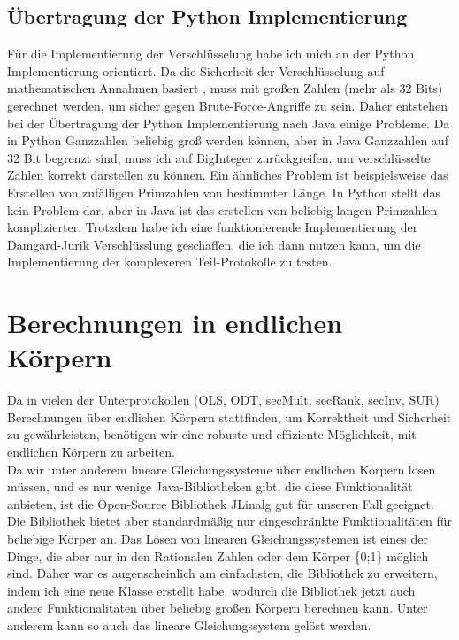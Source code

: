 \subsection{Übertragung der Python Implementierung}
Für die Implementierung der Verschlüsselung habe ich mich an der Python Implementierung \cite{swansonk14} orientiert. Da die Sicherheit der Verschlüsselung auf mathematischen Annahmen basiert  \cite{10.1007/3-540-48910-X_16}, muss mit großen Zahlen (mehr als 32 Bits) gerechnet werden, um sicher gegen Brute-Force-Angriffe zu sein. Daher entstehen bei der Übertragung der Python Implementierung nach Java einige Probleme. Da in Python Ganzzahlen beliebig groß werden können, aber in Java Ganzzahlen auf 32 Bit begrenzt sind, muss ich auf BigInteger zurückgreifen, um verschlüsselte Zahlen korrekt darstellen zu können.
Ein ähnliches Problem ist beispielsweise das Erstellen von zufälligen Primzahlen von bestimmter Länge. In Python stellt das kein Problem dar, aber in Java ist das erstellen von beliebig langen Primzahlen komplizierter. Trotzdem habe ich eine funktionierende Implementierung der Damgard-Jurik Verschlüsslung geschaffen, die ich dann nutzen kann, um die Implementierung der komplexeren Teil-Protokolle zu testen.

\section{Berechnungen in endlichen Körpern}
Da in vielen der Unterprotokollen (OLS, ODT, secMult, secRank, secInv, SUR) Berechnungen über endlichen Körpern stattfinden, um Korrektheit und Sicherheit zu gewährleisten, benötigen wir eine robuste und effiziente Möglichkeit, mit endlichen Körpern zu arbeiten.\\
Da wir unter anderem lineare Gleichungssysteme über endlichen Körpern lösen müssen, und es nur wenige Java-Bibliotheken gibt, die diese Funktionalität anbieten, ist die Open-Source Bibliothek JLinalg \cite{JLinAlg} gut für unseren Fall geeignet. Die Bibliothek bietet aber standardmäßig nur eingeschränkte Funktionalitäten für beliebige Körper an. Das Lösen von linearen Gleichungssystemen ist eines der Dinge, die aber nur in den  Rationalen Zahlen oder dem Körper \{0;1\} möglich sind. Daher war es augenscheinlich am einfachsten, die Bibliothek zu erweitern, indem ich eine neue Klasse erstellt habe, wodurch die Bibliothek jetzt auch andere Funktionalitäten über beliebig großen Körpern berechnen kann. Unter anderem kann so auch das lineare Gleichungssystem gelöst werden.\\

